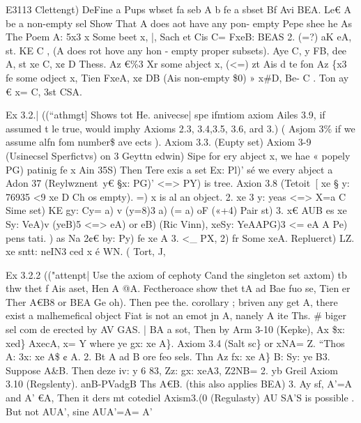 \documentclass[a4paper,12pt]{article}
\begin{document}
\par

\vspace{10pt}

    E3113 Clettengt)  DeFine a Pups wbset fa seb A b fe a sbset Bf Avi BEA.  Le€ A be a non-empty sel  Show That A does aot have any pon- empty Pepe shee he  As The Poem A: 5x3 x Some beet x,    |, Sach et Cis C= FxeB: BEAS    2. (=?) aK eA, st. KE C , (A does rot hove any hon - empty proper subsets).    Aye C, y FB,  dee A, st xe C, x¢ D Thess. Az €\%3 Xr some abject x,    (<=) zt Ais d te fon Az \{x3 fe some odject x,  Tien FxeA, x¢ DB (Ais non-empty \$0) »  x\#D,    Be- C . Ton ay € x= C, 3st CSA. 

\vspace{10pt}

\par

\vspace{10pt}

    Ex 3.2.| ((“athmgt]  Shows tot He. anivecse| spe ifmtiom axiom Ailes 3.9, if assumed t le true,  would imphy Axioms 2.3, 3.4,3.5, 3.6, ard 3.) ( Asjom 3\% if we assume alfn fom    number\$ ave ects ).  Axiom 3.3. (Eupty set)    Axiom 3-9 (Usinecsel Sperfictvs) on 3 Geyttn edwin)  Sipe for ery abject x, we hae « popely PG) patinig fe x Ain 35S)  Then Tere exis a set Ex: Pl)’ sé we every abject a Adon 37 (Reylwznent\   y€ §x: PG)’ <=> PY) is tree. Axion 3.8 (Tetoit\    [ xe § y: 76935 <9 xe D Ch os empty). =) x is al an object.    2. xe 3 y: yeas <=> X=a C Sime set)  KE gy: Cy= a) v (y=8)3 a) (= a) oF («+4) Pair st)    3. x€ AUB es xe Sy: VeA)v (yeB)5 <=> eA) or eB) (Ric Vinn),    xeSy: YeAAPG)3 <= eA A Pe) pens tati. )    as    Na    2¢€ by: Py) fe xe A 3. <\_ PX, 2) fr Some xeA. Repluerct)    LZ. xe sntt: neIN3 ced x é WN. ( Tort, J, 

\vspace{10pt}

\par

\vspace{10pt}

    Ex 3.2.2 (("attenpt|    Use the axiom of cephoty Cand the singleton set axtom) tb thw thet f  Ais aset, Hen A @A. Fectheroace show thet tA ad Bae fuo se,  Tien er Ther A€B8 or BEA Ge oh).    Then pee the. corollary ; briven any get A, there exist a malhemefical object  Fiat is not an emot jn A, nanely A ite Ths. \# biger sel com de erected by AV GAS.    | BA a sot, Then by Arm 3-10 (Kepke), Ax \$x: xed\}  AxecA, x= Y where ye gx: xe A\}. Axiom 3.4 (Salt sc\}    or    xNA= Z.  “Thos A: 3x: xe A\$ ¢ A.    2. Bt A ad B ore feo sels. Thn Az fx: xe A\}    B: Sy: ye B3.  Suppose A\&B.    Then deze iv: y 6 83, Zz: gx: xeA3,  Z2NB= 2. yb Greil Axiom 3.10 (Regslenty). anB-PVadgB  Ths A€B. (this also applies BEA)    3. Ay sf, A’=A and A’ €A, Then it ders mt cotediel Axism3.(0 (Regulasty)  AU SA'S is possible .  But not AUA', sine AUA’=A= A’ 
\end{document}

